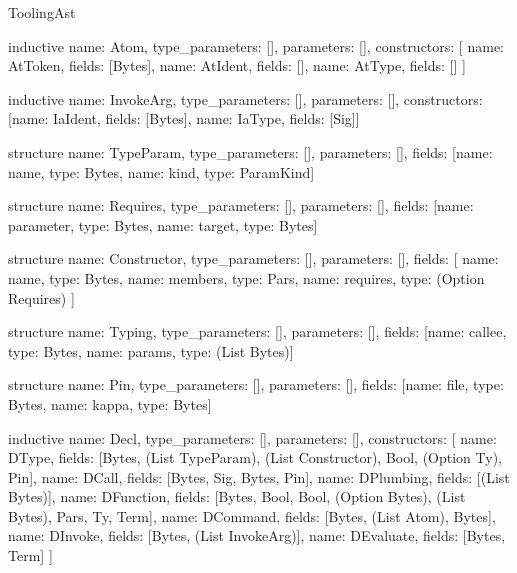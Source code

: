 \begin{lexlean}{ToolingAst}
\begin{semanticmodule}
inductive{
  name: Atom,
  type_parameters: [],
  parameters: [],
  constructors: [
    {name: AtToken, fields: [Bytes]},
    {name: AtIdent, fields: []},
    {name: AtType, fields: []}
  ]
}

inductive{
  name: InvokeArg,
  type_parameters: [],
  parameters: [],
  constructors: [{name: IaIdent, fields: [Bytes]}, {name: IaType, fields: [Sig]}]
}

structure{
  name: TypeParam,
  type_parameters: [],
  parameters: [],
  fields: [{name: name, type: Bytes}, {name: kind, type: ParamKind}]
}

structure{
  name: Requires,
  type_parameters: [],
  parameters: [],
  fields: [{name: parameter, type: Bytes}, {name: target, type: Bytes}]
}

structure{
  name: Constructor,
  type_parameters: [],
  parameters: [],
  fields: [
    {name: name, type: Bytes},
    {name: members, type: Pars},
    {name: requires, type: (Option Requires)}
  ]
}

structure{
  name: Typing,
  type_parameters: [],
  parameters: [],
  fields: [{name: callee, type: Bytes}, {name: params, type: (List Bytes)}]
}

structure{
  name: Pin,
  type_parameters: [],
  parameters: [],
  fields: [{name: file, type: Bytes}, {name: kappa, type: Bytes}]
}

inductive{
  name: Decl,
  type_parameters: [],
  parameters: [],
  constructors: [
    {name: DType, fields: [Bytes, (List TypeParam), (List Constructor), Bool, (Option Ty), Pin]},
    {name: DCall, fields: [Bytes, Sig, Bytes, Pin]},
    {name: DPlumbing, fields: [(List Bytes)]},
    {name: DFunction, fields: [Bytes, Bool, Bool, (Option Bytes), (List Bytes), Pars, Ty, Term]},
    {name: DCommand, fields: [Bytes, (List Atom), Bytes]},
    {name: DInvoke, fields: [Bytes, (List InvokeArg)]},
    {name: DEvaluate, fields: [Bytes, Term]}
  ]
}
\end{semanticmodule}
\end{lexlean}
